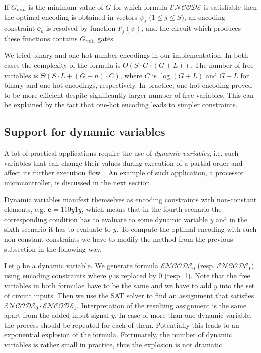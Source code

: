 If $G_{min}$ is the minimum value of $G$ for which formula $\mathcal{ENCODE}$
is satisfiable then the optimal encoding is obtained in vectors $\psi_{j}$
($1\le j\le S$), an encoding constraint $\mathbf{e}_{k}$ is resolved
by function $F_{j}(\psi)$, and the circuit which produces these functions
contains $G_{min}$ gates.

We tried binary and one-hot number encodings in our implementation.
In both cases the complexity of the formula is $\Theta(S\cdot G\cdot(G+L))$.
The number of free variables is $\Theta(S\cdot L+(G+n)\cdot C)$,
where $C$ is $\log(G+L)$ and $G+L$ for binary and one-hot encodings,
respectively. In practice, one-hot encoding proved to be more efficient
despite significantly larger number of free variables. This can be
explained by the fact that one-hot encoding leads to simpler constraints.


\subsection{Support for dynamic variables\label{sub:Support-for-dynamic}}

A lot of practical applications require the use of \emph{dynamic
variables}, i.e. such variables that can change their values during
execution of a partial order and affect its further execution flow~\cite{2009_mokhov_phd}.
An example of such application, a processor microcontroller, is discussed
in the next section.

Dynamic variables manifest themselves as encoding constraints with
non-constant elements, e.g. $\mathbf{e}=110y1\overline{y}$, which
means that in the fourth scenario the corresponding condition has
to evaluate to some dynamic variable $y$ and in the sixth scenario
it has to evaluate to $\overline{y}$. To compute the optimal encoding
with such non-constant constraints we have to modify the method from
the previous subsection in the following way.

Let $y$ be a dynamic variable. We generate formula $\mathcal{ENCODE}_{0}$
(resp. $\mathcal{ENCODE}_{1}$) using encoding constraints where $y$
is replaced by 0 (resp. 1). Note that the free variables in both formulae
have to be the same and we have to add $y$ into the set of circuit
inputs. Then we use the SAT solver to find an assignment that satisfies
$\mathcal{ENCODE}_{0}\cdot\mathcal{ENCODE}_{1}$. Interpretation of
the resulting assignment is the same apart from the added input signal
$y$. In case of more than one dynamic variable, the process should
be repeated for each of them. Potentially this leads to an exponential
explosion of the formula. Fortunately, the number of dynamic variables
is rather small in practice, thus the explosion is not dramatic.

